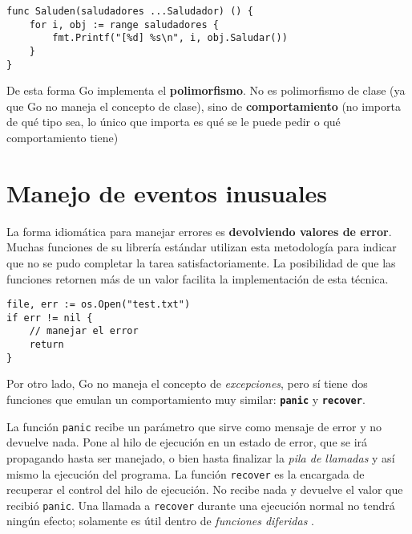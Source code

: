 \vspace*{5mm}
\begin{lstlisting}[title=Comportamiento polimórfico]
func Saluden(saludadores ...Saludador) () {
    for i, obj := range saludadores {
        fmt.Printf("[%d] %s\n", i, obj.Saludar())
    }
}
\end{lstlisting}

De esta forma Go implementa el \textbf{polimorfismo}. No es polimorfismo de clase (ya que Go no maneja el concepto de clase), sino de \textbf{comportamiento} (no importa de qué tipo sea, lo único que importa es qué se le puede pedir o qué comportamiento tiene)  

\section{Manejo de eventos inusuales}

La forma idiomática para manejar errores es \textbf{devolviendo valores de error}. Muchas funciones de su librería estándar utilizan esta metodología para indicar que no se pudo completar la tarea satisfactoriamente.  La posibilidad de que las funciones retornen más de un valor facilita la implementación de esta técnica.

\vspace*{5mm}
\begin{lstlisting}[title={\centering La función \texttt{Open} de la libreria \texttt{os} devuelve el descriptor del archivo que se quiere abrir, y un valor de error}]
file, err := os.Open("test.txt")
if err != nil {
    // manejar el error
    return
}
\end{lstlisting}

Por otro lado, Go no maneja el concepto de \emph{excepciones}, pero sí tiene dos funciones que emulan un comportamiento muy similar: \texttt{\textbf{panic}} y \texttt{\textbf{recover}}.

La función \texttt{panic} recibe un parámetro que sirve como mensaje de error y no devuelve nada. Pone al hilo de ejecución en un estado de error, que se irá propagando hasta ser manejado, o bien hasta finalizar la \emph{pila de llamadas} y así mismo la ejecución del programa. La función \texttt{recover} es la encargada de recuperar el control del hilo de ejecución. No recibe nada y devuelve el valor que recibió \texttt{panic}.  Una llamada a \texttt{recover} durante una ejecución normal no tendrá ningún efecto; solamente es útil dentro de \emph{funciones diferidas} \autocite{BlogGolangDeferPanicRecover}.  

